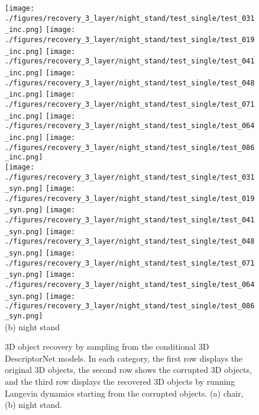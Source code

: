 \documentclass[10pt,twocolumn,letterpaper]{article}
\begin{document}
\begin{figure}
    \texttt{[image: ./figures/recovery\_3\_layer/night\_stand/test\_single/test\_031\_inc.png]} \hspace{-1.8mm}
    \texttt{[image: ./figures/recovery\_3\_layer/night\_stand/test\_single/test\_019\_inc.png]} \hspace{-1.8mm}
    \texttt{[image: ./figures/recovery\_3\_layer/night\_stand/test\_single/test\_041\_inc.png]} \hspace{-1.8mm}
    \texttt{[image: ./figures/recovery\_3\_layer/night\_stand/test\_single/test\_048\_inc.png]} \hspace{-1.8mm}
    \texttt{[image: ./figures/recovery\_3\_layer/night\_stand/test\_single/test\_071\_inc.png]} \hspace{-1.8mm}
    \texttt{[image: ./figures/recovery\_3\_layer/night\_stand/test\_single/test\_064\_inc.png]} \hspace{-1.8mm}
    \texttt{[image: ./figures/recovery\_3\_layer/night\_stand/test\_single/test\_086\_inc.png]} \hspace{-1.8mm}\\
    \texttt{[image: ./figures/recovery\_3\_layer/night\_stand/test\_single/test\_031\_syn.png]} \hspace{-1.8mm}
    \texttt{[image: ./figures/recovery\_3\_layer/night\_stand/test\_single/test\_019\_syn.png]} \hspace{-1.8mm}
    \texttt{[image: ./figures/recovery\_3\_layer/night\_stand/test\_single/test\_041\_syn.png]} \hspace{-1.8mm}
    \texttt{[image: ./figures/recovery\_3\_layer/night\_stand/test\_single/test\_048\_syn.png]} \hspace{-1.8mm}
    \texttt{[image: ./figures/recovery\_3\_layer/night\_stand/test\_single/test\_071\_syn.png]} \hspace{-1.8mm}
    \texttt{[image: ./figures/recovery\_3\_layer/night\_stand/test\_single/test\_064\_syn.png]} \hspace{-1.8mm}
    \texttt{[image: ./figures/recovery\_3\_layer/night\_stand/test\_single/test\_086\_syn.png]} \hspace{-1.8mm}\\
	(b) night stand	
	\caption{3D object recovery by sampling from the conditional 3D DescriptorNet models. In each category, the first row displays the original 3D objects, the second row shows the corrupted 3D objects, and the third row displays the recovered 3D objects by running Langevin dynamics starting from the corrupted objects. (a) chair, (b) night stand.}	
	\label{fig:recovery}
\end{figure}
 
\end{document}
